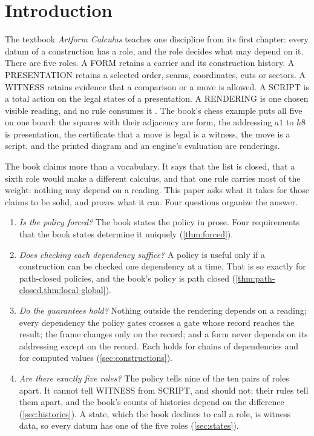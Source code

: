 \documentclass[11pt]{article}
\numberwithin{equation}{section}
\theoremstyle{definition}
\theoremstyle{plain}
\theoremstyle{remark}
\newcommand{\FORM}{\textsf{FORM}}
\newcommand{\PRES}{\textsf{PRESENTATION}}
\newcommand{\WIT}{\textsf{WITNESS}}
\newcommand{\SCR}{\textsf{SCRIPT}}
\newcommand{\REN}{\textsf{RENDERING}}
\begin{document}
\tableofcontents

\section{Introduction}\label{sec:intro}

The textbook \emph{Artform Calculus} \cite{Book} teaches one discipline from
its first chapter: every datum of a construction has a role, and the role
decides what may depend on it.  There are five roles.  A \FORM{} retains a
carrier and its construction history.  A \PRES{} retains a selected order,
seams, coordinates, cuts or sectors.  A \WIT{} retains evidence that a
comparison or a move is allowed.  A \SCR{} is a total action on the legal
states of a presentation.  A \REN{} is one chosen visible reading, and no
rule consumes it \cite[\S1.9]{Book}.  The book's chess example puts all five
on one board: the squares with their adjacency are form, the addressing
\(a1\) to \(h8\) is presentation, the certificate that a move is legal is a
witness, the move is a script, and the printed diagram and an engine's
evaluation are renderings.

The book claims more than a vocabulary.  It says that the list is closed,
that a sixth role would make a different calculus, and that one rule carries
most of the weight: nothing may depend on a reading.  This paper asks what it
takes for those claims to be solid, and proves what it can.  Four questions
organize the answer.
\begin{enumerate}[label=(\arabic*),leftmargin=2.2em]
\item \emph{Is the policy forced?}  The book states the policy in prose.
Four requirements that the book states determine it uniquely
(\cref{thm:forced}).
\item \emph{Does checking each dependency suffice?}  A policy is useful only
if a construction can be checked one dependency at a time.  That is so
exactly for path-closed policies, and the book's policy is path closed
(\cref{thm:path-closed,thm:local-global}).
\item \emph{Do the guarantees hold?}  Nothing outside the rendering depends
on a reading; every dependency the policy gates crosses a gate whose record
reaches the result; the frame changes only on the record; and a form never
depends on its addressing except on the record.  Each holds for chains of
dependencies and for computed values (\cref{sec:constructions}).
\item \emph{Are there exactly five roles?}  The policy tells nine of the ten
pairs of roles apart.  It cannot tell \WIT{} from \SCR, and should not; their
rules tell them apart, and the book's counts of histories depend on the
difference (\cref{sec:histories}).  A state, which the book declines to call
a role, is witness data, so every datum has one of the five roles
(\cref{sec:states}).
\end{enumerate}
\end{document}
